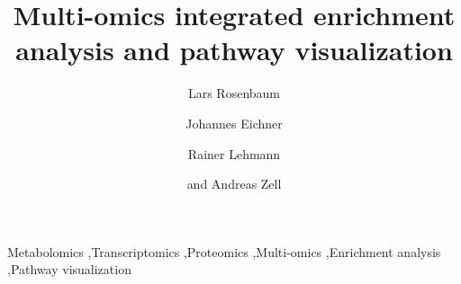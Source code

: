 \documentclass[final,5p,times,twocolumn]{elsarticle}
\begin{document}
\begin{frontmatter}



\title{Multi-omics integrated enrichment analysis and pathway visualization}


\author[uni]{Lars Rosenbaum}
\author[uni]{Johannes Eichner}
\author[klinikum,dzd]{Rainer Lehmann}
\author[uni]{and Andreas Zell}
\address[uni]{Center for Bioinformatics, University of T\"ubingen, T\"ubingen, Germany}
\address[klinikum]{Division of Clinical Chemistry and Pathobiochemistry (Central Laboratory), University Hospital T\"ubingen, T\"ubingen, Germany}
\address[dzd]{Institute of Diabetes Research and Metabolic Diseases, Member of the German Center for Diabetes Research, University of T\"ubingen, T\"ubingen, Germany}



\begin{abstract}

\end{abstract}

\begin{keyword}
Metabolomics \sep Transcriptomics \sep Proteomics \sep Multi-omics \sep Enrichment analysis \sep Pathway visualization

\end{keyword}

\end{frontmatter}
\end{document}
